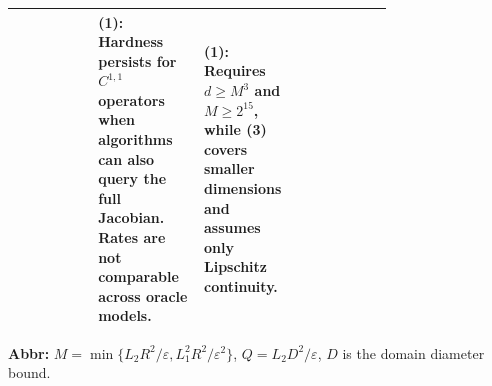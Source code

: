 \begin{table}[tp]
\begin{threeparttable}
\begin{tabularx}{\linewidth}{@{}>{\raggedright\arraybackslash}p{0.22\linewidth}>{\raggedright\arraybackslash}p{0.28\linewidth}>{\raggedright\arraybackslash}p{0.25\linewidth}>{\raggedright\arraybackslash}X@{}}
& \textbf{(1)}: Hardness persists for $C^{1,1}$ operators when algorithms can also query the full Jacobian. Rates are not comparable across oracle models.
& \textbf{(1)}: Requires $d\ge M^3$ and $M\ge2^{15}$, while \textbf{(3)} covers smaller dimensions and assumes only Lipschitz continuity. \\
\bottomrule
\end{tabularx}
\begin{tablenotes}[flushleft]\footnotesize
\item[] \textbf{Abbr:} $M=\min\{L_2R^2/\varepsilon,L_1^2R^2/\varepsilon^2\}$, $Q=L_2D^2/\varepsilon$, $D$ is the domain diameter bound.
\end{tablenotes}
\end{threeparttable}
\end{table}
